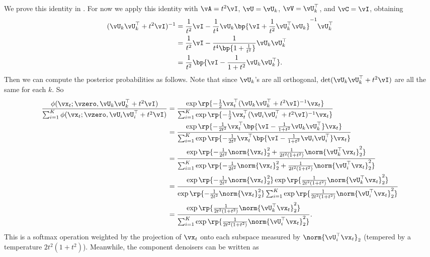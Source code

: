 \documentclass[../../book-main.tex]{subfiles}
\begin{document}
{\begin{equation}
\end{equation}
We prove this identity in . For now we apply this identity with \(\vA = t^{2}\vI\), \(\vU = \vU_{k}\), \(\vV = \vU_{k}^{\top}\), and \(\vC = \vI\), obtaining
\begin{align}
	(\vU_{k}\vU_{k}^{\top} + t^{2}\vI)^{-1} 
	&= \frac{1}{t^{2}}\vI - \frac{1}{t^{4}}\vU_{k}\bp{\vI + \frac{1}{t^{2}}\vU_{k}^{\top}\vU_{k}}^{-1}\vU_{k}^{\top} \\
	&= \frac{1}{t^{2}}\vI - \frac{1}{t^{4}\bp{1 + \frac{1}{t^{2}}}}\vU_{k}\vU_{k}^{\top} \\
	&= \frac{1}{t^{2}}\bp{\vI - \frac{1}{1 + t^{2}}\vU_{k}\vU_{k}^{\top}}.
\end{align}
Then we can compute the posterior probabilities as follows. Note that since \(\vU_{k}\)'s are all orthogonal, \(\det(\vU_{k}\vU_{k}^{\top} + t^{2}\vI)\) are all the same for each \(k\). So
\begin{align}
	\frac{\phi(\vx_{t} ; \vzero, \vU_{k}\vU_{k}^{\top} + t^{2}\vI)}{\sum_{i
	= 1}^{K}\phi(\vx_{t} ; \vzero, \vU_{i}\vU_{i}^{\top} + t^{2}\vI)} 
	&= \frac{\exp\rp{-\frac{1}{2}\vx_{t}^{\top}(\vU_{k}\vU_{k}^{\top} + t^{2}\vI)^{-1}\vx_{t}}}{\sum_{i = 1}^{K}\exp\rp{-\frac{1}{2}\vx_{t}^{\top}(\vU_{i}\vU_{i}^{\top} + t^{2}\vI)^{-1}\vx_{t}}} \\
	&= \frac{\exp\rp{-\frac{1}{2t^{2}}\vx_{t}^{\top}\bp{\vI - \frac{1}{1 + t^{2}}\vU_{k}\vU_{k}^{\top}}\vx_{t}}}{\sum_{i = 1}^{K}\exp\rp{-\frac{1}{2t^{2}}\vx_{t}^{\top}\bp{\vI - \frac{1}{1 + t^{2}}\vU_{i}\vU_{i}^{\top}}\vx_{t}}} \\
	&= \frac{\exp\rp{-\frac{1}{2t^{2}}\norm{\vx_{t}}_{2}^{2} + \frac{1}{2t^{2}(1 + t^{2})}\norm{\vU_{k}^{\top}\vx_{t}}_{2}^{2}}}{\sum_{i = 1}^{K}\exp\rp{-\frac{1}{2t^{2}}\norm{\vx_{t}}_{2}^{2} + \frac{1}{2t^{2}(1 + t^{2})}\norm{\vU_{i}^{\top}\vx_{t}}_{2}^{2}}} \\
	&= \frac{\exp\rp{-\frac{1}{2t^{2}}\norm{\vx_{t}}_{2}^{2}}\exp\rp{\frac{1}{2t^{2}(1 + t^{2})}\norm{\vU_{k}^{\top}\vx_{t}}_{2}^{2}}}{\exp\rp{-\frac{1}{2t^{2}}\norm{\vx_{t}}_{2}^{2}}\sum_{i = 1}^{K}\exp\rp{\frac{1}{2t^{2}(1 + t^{2})}\norm{\vU_{i}^{\top}\vx_{t}}_{2}^{2}}} \\
	&= \frac{\exp\rp{\frac{1}{2t^{2}(1 + t^{2})}\norm{\vU_{k}^{\top}\vx_{t}}_{2}^{2}}}{\sum_{i = 1}^{K}\exp\rp{\frac{1}{2t^{2}(1 + t^{2})}\norm{\vU_{i}^{\top}\vx_{t}}_{2}^{2}}}.
\end{align}
This is a softmax operation weighted by the projection of \(\vx_{t}\) onto each subspace measured by \(\norm{\vU_{i}^{\top}\vx_{t}}_{2}\) (tempered by a temperature \(2t^{2}(1 + t^{2})\)). Meanwhile, the component denoisers can be written as 
}
\end{document}
